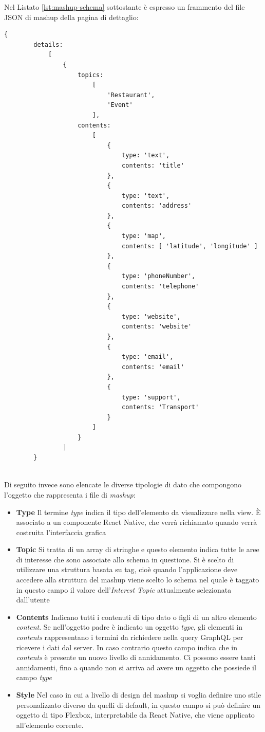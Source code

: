 Nel Listato \ref{lst:mashup-schema} sottostante è espresso un frammento del file JSON di mashup della pagina di dettaglio:
\begin{lstlisting}[backgroundcolor = \color{lightgray},
								caption = Esempio Schema Mashup,
								label = lst:mashup-schema]
	{	
		details: 
			[ 
				{ 
					topics:	
						[ 
							'Restaurant',
							'Event' 
						],
					contents: 
						[ 
							{ 
								type: 'text', 
								contents: 'title' 
							},
							{ 
								type: 'text', 
								contents: 'address'
							},
							{ 
								type: 'map', 
								contents: [ 'latitude', 'longitude' ] 
							},
							{ 
								type: 'phoneNumber', 
								contents: 'telephone' 
							},
							{ 
								type: 'website', 
								contents: 'website' 
							},
							{ 
								type: 'email',
								contents: 'email' 
							},
							{ 
								type: 'support', 
								contents: 'Transport' 
							}
						] 
					}
				]	
		}
	
\end{lstlisting}

Di seguito invece sono elencate le diverse tipologie di dato che compongono l'oggetto che rappresenta i file di \emph{mashup}:
\begin{itemize}
	\item \textbf{Type} Il termine \emph{type} indica il tipo dell'elemento da visualizzare nella view. È associato a un componente React Native, che verrà richiamato quando verrà costruita l'interfaccia grafica
	\item \textbf{Topic} Si tratta di un array di stringhe e questo elemento indica tutte le aree di interesse che sono associate allo schema in questione. Si è scelto di utilizzare una struttura basata su tag, cioè quando l'applicazione deve accedere alla struttura del mashup viene scelto lo schema nel quale è taggato in questo campo il valore dell'\emph{Interest Topic} attualmente selezionata dall'utente
	\item \textbf{Contents} Indicano tutti i contenuti di tipo dato o figli di un altro elemento \emph{content}. Se nell'oggetto padre è indicato un oggetto \emph{type}, gli elementi in \emph{contents} rappresentano i termini da richiedere nella query GraphQL per ricevere i dati dal server. In caso contrario questo campo indica che in \emph{contents} è presente un nuovo livello di annidamento. Ci possono essere tanti annidamenti, fino a quando non si arriva ad avere un oggetto che possiede il campo \emph{type}
	\item \textbf{Style} Nel caso in cui a livello di design del mashup si voglia definire uno stile personalizzato diverso da quelli di default, in questo campo si può definire un oggetto di tipo Flexbox, interpretabile da React Native, che viene applicato all'elemento corrente. 
\end{itemize}

